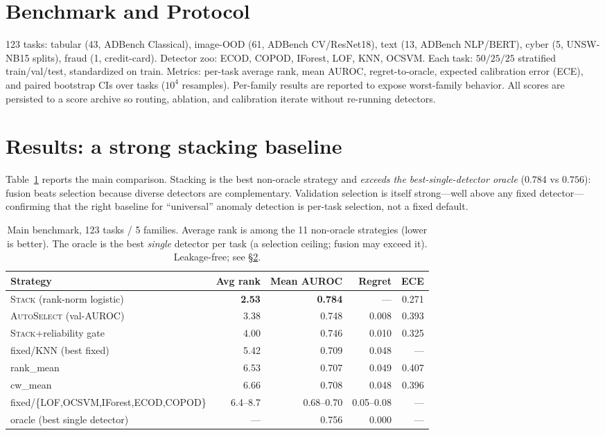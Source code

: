 \documentclass[11pt]{article}
\newcommand{\stack}{\textsc{Stack}}
\newcommand{\auto}{\textsc{AutoSelect}}
\begin{document}
\section{Benchmark and Protocol}
123 tasks: tabular (43, ADBench Classical), image-OOD (61, ADBench CV/ResNet18), text
(13, ADBench NLP/BERT), cyber (5, UNSW-NB15 splits), fraud (1, credit-card). Detector
zoo: ECOD, COPOD, IForest, LOF, KNN, OCSVM. Each task: $50/25/25$ stratified
train/val/test, standardized on train. Metrics: per-task average rank, mean AUROC,
regret-to-oracle, expected calibration error (ECE), and paired bootstrap CIs over
tasks ($10^4$ resamples). Per-family results are reported to expose worst-family
behavior. All scores are persisted to a score archive so routing, ablation, and
calibration iterate without re-running detectors.

\section{Results: a strong stacking baseline}\label{sec:results}
Table~\ref{tab:main} reports the main comparison. Stacking is the best non-oracle
strategy and \emph{exceeds the best-single-detector oracle} ($0.784$ vs $0.756$):
fusion beats selection because diverse detectors are complementary. Validation
selection is itself strong---well above any fixed detector---confirming that the right
baseline for ``universal'' anomaly detection is per-task selection, not a fixed default.

\begin{table}[t]\centering
\caption{Main benchmark, 123 tasks / 5 families. Average rank is among the 11 non-oracle
strategies (lower is better). The oracle is the best \emph{single} detector per task
(a selection ceiling; fusion may exceed it). Leakage-free; see \S\ref{sec:results}.}
\label{tab:main}
\begin{tabular}{lrrrr}
\toprule
Strategy & Avg rank & Mean AUROC & Regret & ECE \\
\midrule
\stack{} (rank-norm logistic) & \textbf{2.53} & \textbf{0.784} & --- & 0.271 \\
\auto{} (val-AUROC) & 3.38 & 0.748 & 0.008 & 0.393 \\
\stack{}+reliability gate & 4.00 & 0.746 & 0.010 & 0.325 \\
fixed/KNN (best fixed) & 5.42 & 0.709 & 0.048 & --- \\
rank\_mean & 6.53 & 0.707 & 0.049 & 0.407 \\
cw\_mean & 6.66 & 0.708 & 0.048 & 0.396 \\
fixed/\{LOF,OCSVM,IForest,ECOD,COPOD\} & 6.4--8.7 & 0.68--0.70 & 0.05--0.08 & --- \\
\midrule
oracle (best single detector) & --- & 0.756 & 0.000 & --- \\
\bottomrule
\end{tabular}
\end{table}
\end{document}
